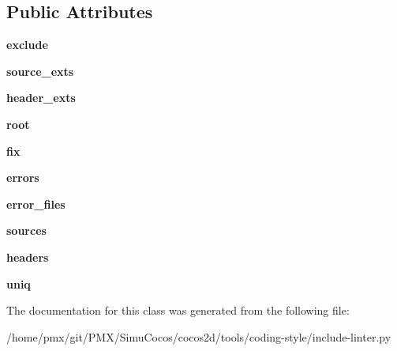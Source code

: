 \subsection*{Public Attributes}
\begin{DoxyCompactItemize}
\item 
\mbox{\label{classinclude-linter_1_1LintContext_a0c0307f78dcf6525c97e2e29e857c337}} 
{\bfseries exclude}
\item 
\mbox{\label{classinclude-linter_1_1LintContext_a8f4f7470d8b1bc8bcb1a50a7087c8b06}} 
{\bfseries source\+\_\+exts}
\item 
\mbox{\label{classinclude-linter_1_1LintContext_ac64f36e7917b974985e1f612ee088f01}} 
{\bfseries header\+\_\+exts}
\item 
\mbox{\label{classinclude-linter_1_1LintContext_a5898c369c762ece4faecf04c76ceb854}} 
{\bfseries root}
\item 
\mbox{\label{classinclude-linter_1_1LintContext_a46d8dab43bfc14e651eeee6c4d155d1d}} 
{\bfseries fix}
\item 
\mbox{\label{classinclude-linter_1_1LintContext_a439727193c0378e4b7bed75864e9eeb1}} 
{\bfseries errors}
\item 
\mbox{\label{classinclude-linter_1_1LintContext_ab654415a8d4b84700df27bc4c7f4a432}} 
{\bfseries error\+\_\+files}
\item 
\mbox{\label{classinclude-linter_1_1LintContext_adee66a7389b3b8dd872692fc14ac1027}} 
{\bfseries sources}
\item 
\mbox{\label{classinclude-linter_1_1LintContext_a3ba206ee883e2658a1abd6088b4e9892}} 
{\bfseries headers}
\item 
\mbox{\label{classinclude-linter_1_1LintContext_a226d652e1b3404d4429afda2d084d5b1}} 
{\bfseries uniq}
\end{DoxyCompactItemize}


The documentation for this class was generated from the following file\+:\begin{DoxyCompactItemize}
\item 
/home/pmx/git/\+P\+M\+X/\+Simu\+Cocos/cocos2d/tools/coding-\/style/include-\/linter.\+py\end{DoxyCompactItemize}
